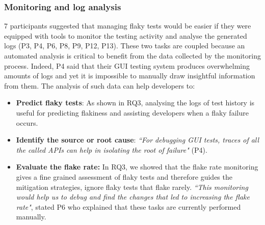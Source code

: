\subsubsection{\textbf{Monitoring and log analysis}}
7 participants suggested that managing flaky tests would be easier if they were equipped with tools to monitor the testing activity and analyse the generated logs (P3, P4, P6, P8, P9, P12, P13).
These two tasks are coupled because an automated analysis is critical to benefit from the data collected by the monitoring process.
Indeed, P4 said that their GUI testing system produces overwhelming amounts of logs and yet it is impossible to manually draw insightful information from them.
The analysis of such data can help developers to: 
\begin{itemize}[wide=10pt,noitemsep,topsep=0pt]
    \item\textbf{Predict flaky tests}: As shown in \textsc{RQ3}, analysing the logs of test history is useful for predicting flakiness and assisting developers when a flaky failure occurs.
    \item \textbf{Identify the source or root cause}: \textit{``For debugging GUI tests, traces of all the called APIs can help in isolating the root of failure"} (P4).
    \item \textbf{Evaluate the flake rate:} In \textsc{RQ3}, we showed that the flake rate monitoring gives a fine grained assessment of flaky tests and therefore guides the mitigation strategies, \eg ignore flaky tests that flake rarely.
    \textit{``This monitoring would help us to debug and find the changes that led to increasing the flake rate"}, stated P6 who explained that these tasks are currently performed manually.
\end{itemize}

